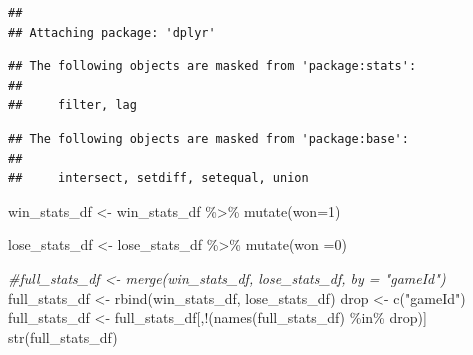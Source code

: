 \documentclass[
]{article}
\newenvironment{Shaded}{\begin{snugshade}}{\end{snugshade}}
\newcommand{\AttributeTok}[1]{\textcolor[rgb]{0.77,0.63,0.00}{#1}}
\newcommand{\CommentTok}[1]{\textcolor[rgb]{0.56,0.35,0.01}{\textit{#1}}}
\newcommand{\DecValTok}[1]{\textcolor[rgb]{0.00,0.00,0.81}{#1}}
\newcommand{\FunctionTok}[1]{\textcolor[rgb]{0.00,0.00,0.00}{#1}}
\newcommand{\NormalTok}[1]{#1}
\newcommand{\OtherTok}[1]{\textcolor[rgb]{0.56,0.35,0.01}{#1}}
\newcommand{\SpecialCharTok}[1]{\textcolor[rgb]{0.00,0.00,0.00}{#1}}
\newcommand{\StringTok}[1]{\textcolor[rgb]{0.31,0.60,0.02}{#1}}
\begin{document}
\begin{verbatim}
## 
## Attaching package: 'dplyr'
\end{verbatim}

\begin{verbatim}
## The following objects are masked from 'package:stats':
## 
##     filter, lag
\end{verbatim}

\begin{verbatim}
## The following objects are masked from 'package:base':
## 
##     intersect, setdiff, setequal, union
\end{verbatim}

\begin{Shaded}
\begin{Highlighting}[]
\NormalTok{win\_stats\_df }\OtherTok{\textless{}{-}}\NormalTok{ win\_stats\_df }\SpecialCharTok{\%\textgreater{}\%}
  \FunctionTok{mutate}\NormalTok{(}\AttributeTok{won=}\DecValTok{1}\NormalTok{)}

\NormalTok{lose\_stats\_df }\OtherTok{\textless{}{-}}\NormalTok{ lose\_stats\_df }\SpecialCharTok{\%\textgreater{}\%}
  \FunctionTok{mutate}\NormalTok{(}\AttributeTok{won =}\DecValTok{0}\NormalTok{)}

\CommentTok{\#full\_stats\_df \textless{}{-} merge(win\_stats\_df, lose\_stats\_df, by = "gameId")}
\NormalTok{full\_stats\_df }\OtherTok{\textless{}{-}} \FunctionTok{rbind}\NormalTok{(win\_stats\_df, lose\_stats\_df)}
\NormalTok{drop }\OtherTok{\textless{}{-}} \FunctionTok{c}\NormalTok{(}\StringTok{"gameId"}\NormalTok{)}
\NormalTok{full\_stats\_df }\OtherTok{\textless{}{-}}\NormalTok{ full\_stats\_df[,}\SpecialCharTok{!}\NormalTok{(}\FunctionTok{names}\NormalTok{(full\_stats\_df) }\SpecialCharTok{\%in\%}\NormalTok{ drop)]}
\FunctionTok{str}\NormalTok{(full\_stats\_df)}
\end{Highlighting}
\end{Shaded}
\end{document}
